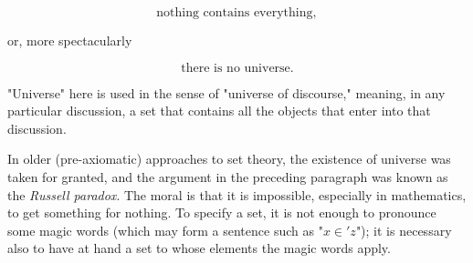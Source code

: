 \begin{equation*}
\text{nothing contains everything},
\end{equation*}

or, more spectacularly

\begin{equation*}
\text{there is no universe}.
\end{equation*}

"Universe" here is used in the sense of "universe of discourse," meaning, in any particular discussion, a set that contains all the objects that enter into that discussion. 

In older (pre-axiomatic) approaches to set theory, the existence of universe was taken for granted, and the argument in the preceding paragraph was known as the \textit{Russell paradox}. The moral is that it is impossible, especially in mathematics, to get something for nothing. To specify a set, it is not enough to pronounce some magic words (which may form a sentence such as "$x \in ' z$"); it is necessary also to have at hand a set to whose elements the magic words apply. 